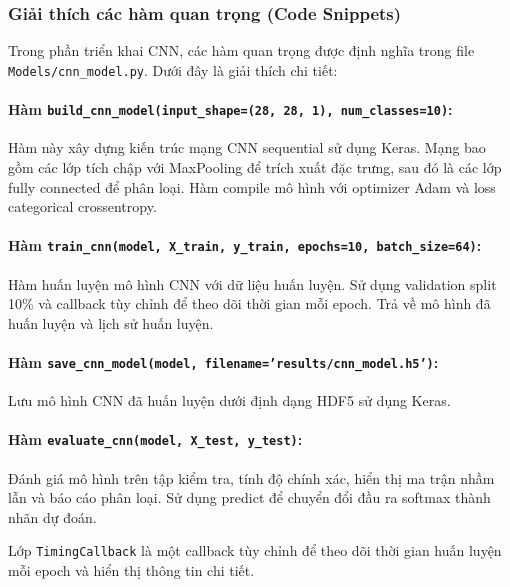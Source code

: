 \documentclass[../DoAn.tex]{subfiles}
\begin{document}
\subsubsection{Giải thích các hàm quan trọng (Code Snippets)}

Trong phần triển khai CNN, các hàm quan trọng được định nghĩa trong file \texttt{Models/cnn\_model.py}. Dưới đây là giải thích chi tiết:

\paragraph{Hàm \texttt{build\_cnn\_model(input\_shape=(28, 28, 1), num\_classes=10)}:}
Hàm này xây dựng kiến trúc mạng CNN sequential sử dụng Keras. Mạng bao gồm các lớp tích chập với MaxPooling để trích xuất đặc trưng, sau đó là các lớp fully connected để phân loại. Hàm compile mô hình với optimizer Adam và loss categorical crossentropy.

\paragraph{Hàm \texttt{train\_cnn(model, X\_train, y\_train, epochs=10, batch\_size=64)}:}
Hàm huấn luyện mô hình CNN với dữ liệu huấn luyện. Sử dụng validation split 10\% và callback tùy chỉnh để theo dõi thời gian mỗi epoch. Trả về mô hình đã huấn luyện và lịch sử huấn luyện.

\paragraph{Hàm \texttt{save\_cnn\_model(model, filename='results/cnn\_model.h5')}:}
Lưu mô hình CNN đã huấn luyện dưới định dạng HDF5 sử dụng Keras.

\paragraph{Hàm \texttt{evaluate\_cnn(model, X\_test, y\_test)}:}
Đánh giá mô hình trên tập kiểm tra, tính độ chính xác, hiển thị ma trận nhầm lẫn và báo cáo phân loại. Sử dụng predict để chuyển đổi đầu ra softmax thành nhãn dự đoán.

Lớp \texttt{TimingCallback} là một callback tùy chỉnh để theo dõi thời gian huấn luyện mỗi epoch và hiển thị thông tin chi tiết.
\end{document}
